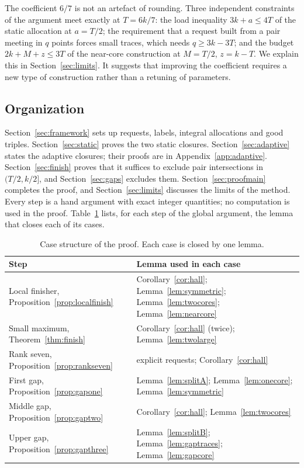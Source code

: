 \documentclass[11pt]{article}
\numberwithin{equation}{section}
\theoremstyle{definition}
\theoremstyle{remark}
\begin{document}
The coefficient $6/7$ is not an artefact of rounding. Three independent
constraints of the argument meet exactly at $T=6k/7$: the load
inequality $3k+a\le4T$ of the static allocation at $a=T/2$; the
requirement that a request built from a pair meeting in $q$ points
forces small traces, which needs $q\ge3k-3T$; and the budget
$2k+M+z\le3T$ of the near-core construction at $M=T/2$, $z=k-T$. We
explain this in Section~\ref{sec:limits}. It suggests that improving
the coefficient requires a new type of construction rather than a
retuning of parameters.

\subsection*{Organization}
Section~\ref{sec:framework} sets up requests, labels, integral
allocations and good triples. Section~\ref{sec:static} proves the two
static closures. Section~\ref{sec:adaptive} states the adaptive
closures; their proofs are in Appendix~\ref{app:adaptive}.
Section~\ref{sec:finish} proves that it suffices to exclude pair
intersections in $(T/2,k/2]$, and Section~\ref{sec:gaps} excludes them.
Section~\ref{sec:proofmain} completes the proof, and
Section~\ref{sec:limits} discusses the limits of the method. Every step is a hand argument with exact integer quantities;
no computation is used in the proof.
Table~\ref{tab:dependencies} lists, for each step of the global
argument, the lemma that closes each of its cases.

\begin{table}[ht]
\centering\small
\begin{tabular}{>{\raggedright\arraybackslash}p{}>{\raggedright\arraybackslash}p{}}
\toprule
Step & Lemma used in each case\\
\midrule
Local finisher, Proposition~\ref{prop:localfinish}
 & Corollary~\ref{cor:hall}; Lemma~\ref{lem:symmetric}; Lemma~\ref{lem:twocores}; Lemma~\ref{lem:nearcore}\\
Small maximum, Theorem~\ref{thm:finish}
 & Corollary~\ref{cor:hall} (twice); Lemma~\ref{lem:twolarge}\\
Rank seven, Proposition~\ref{prop:rankseven}
 & explicit requests; Corollary~\ref{cor:hall}\\
First gap, Proposition~\ref{prop:gapone}
 & Lemma~\ref{lem:splitA}; Lemma~\ref{lem:onecore}; Lemma~\ref{lem:symmetric}\\
Middle gap, Proposition~\ref{prop:gaptwo}
 & Corollary~\ref{cor:hall}; Lemma~\ref{lem:twocores}\\
Upper gap, Proposition~\ref{prop:gapthree}
 & Lemma~\ref{lem:splitB}; Lemma~\ref{lem:gaptraces}; Lemma~\ref{lem:gapcore}\\
\bottomrule
\end{tabular}
\caption{Case structure of the proof. Each case is closed by one lemma.}
\label{tab:dependencies}
\end{table}
\end{document}
